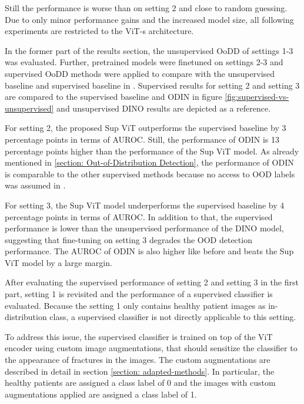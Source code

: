 Still the performance is worse than on setting 2 and close to random guessing.
Due to only minor performance gains and the increased model size, all following experiments are restricted to the ViT-s architecture.
\par
In the former part of the results section, the unsupervised OoDD of settings 1-3 was evaluated.
Further, pretrained models were finetuned on settings 2-3 and supervised OoDD methods were applied to compare with the unsupervised baseline and supervised baseline in \citep{Berger2021}.
Supervised results for setting 2 and setting 3 are compared to the supervised baseline and ODIN in figure \ref{fig:supervised-vs-unsupervised} and unsupervised DINO results are depicted as a reference.
\par
For setting 2, the proposed Sup ViT outperforms the supervised baseline by 3 percentage points in terms of AUROC.
Still, the performance of ODIN is 13 percentage points higher than the performance of the Sup ViT model.
As already mentioned in \ref{section: Out-of-Distribution Detection}, the performance of ODIN is comparable to the other supervised methods because no access to OOD labels was assumed in \citep{Berger2021}.
\par
For setting 3, the Sup ViT model underperforms the supervised baseline by 4 percentage points in terms of AUROC.
In addition to that, the supervised performance is lower than the unsupervised performance of the DINO model, suggesting that fine-tuning on setting 3 degrades the OOD detection performance.
The AUROC of ODIN is also higher like before and beats the Sup ViT model by a large margin.
\par
After evaluating the supervised performance of setting 2 and setting 3 in the first part, setting 1 is revisited and the performance of a supervised classifier is evaluated.
Because the setting 1 only contains healthy patient images as in-distribution class, a supervised classifier is not directly applicable to this setting.
\par
To address this issue, the supervised classifier is trained on top of the ViT encoder using custom image augmentations, that should sensitize the classifier to the appearance of fractures in the images.
The custom augmentations are described in detail in section \ref{section: adapted-methods}.
In particular, the healthy patients are assigned a class label of 0 and the images with custom augmentations applied are assigned a class label of 1.
